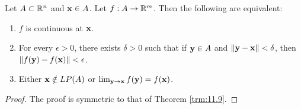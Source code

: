 \documentclass[../main.tex]{subfiles}
\begin{document}
\begin{theorem}\label{trm:18.31}
    Let $A\subset\mathbb{R}^n$ and $\mathbf{x}\in A$. Let $f:A\to\mathbb{R}^m$. Then the following are equivalent:
    \begin{enumerate}[label={\textup{(}\alph*\textup{)}}]
        \item $f$ is continuous at $\mathbf{x}$.
        \item For every $\epsilon>0$, there exists $\delta>0$ such that if $\mathbf{y}\in A$ and $\norm{\mathbf{y}-\mathbf{x}}<\delta$, then $\norm{f(\mathbf{y})-f(\mathbf{x})}<\epsilon$.
        \item Either $\mathbf{x}\notin LP(A)$ or $\lim_{\mathbf{y}\to\mathbf{x}}f(\mathbf{y})=f(\mathbf{x})$.
    \end{enumerate}
    \begin{proof}
        The proof is symmetric to that of Theorem \ref{trm:11.9}.
    \end{proof}
\end{theorem}
\end{document}
